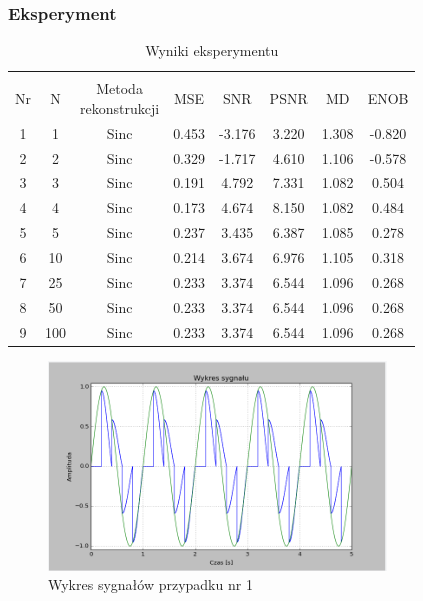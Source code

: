 \documentclass{article}
\begin{document}
    \subsubsection{Eksperyment}

    \begin{table}[h!]
        \centering
        \vspace{0.2cm}
        \begin{tabular}{|c|c|c|c|c|c|c|c|}
            \hline\hline\\[-0.4cm]
            Nr & N & \shortstack{Metoda\\ rekonstrukcji} & MSE & SNR & PSNR & MD & ENOB  \\
            \hline
            1 & 1 & Sinc & 0.453 & -3.176 & 3.220 & 1.308 & -0.820 \\
            \hline
            2 & 2 & Sinc & 0.329 & -1.717 & 4.610 & 1.106 & -0.578    \\
            \hline
            3 & 3 & Sinc & 0.191 & 4.792 & 7.331 & 1.082 & 0.504    \\
            \hline
            4 & 4 & Sinc & 0.173 & 4.674 & 8.150 & 1.082 & 0.484  \\
            \hline
            5 & 5 & Sinc & 0.237 & 3.435 & 6.387 & 1.085 & 0.278    \\
            \hline
            6 & 10 & Sinc & 0.214 & 3.674 & 6.976 & 1.105 & 0.318   \\
            \hline
            7 & 25 & Sinc & 0.233 & 3.374 & 6.544 & 1.096 & 0.268   \\
            \hline
            8 & 50 & Sinc & 0.233 & 3.374 & 6.544 & 1.096 & 0.268   \\
            \hline
            9 & 100 & Sinc & 0.233 & 3.374 & 6.544 & 1.096 & 0.268  \\
            \hline
        \end{tabular}
        \caption{Wyniki eksperymentu}
    \end{table}
    \FloatBarrier

    \begin{figure}[h!]
        \centering
        \includegraphics[width=0.8\textwidth]{img/1/sinc1.png}
        \caption{Wykres sygnałów przypadku nr 1}
    \end{figure}
    \FloatBarrier
\end{document}
